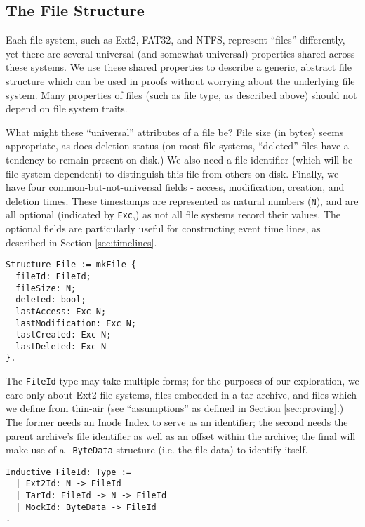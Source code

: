\documentclass[nocopyrightspace]{sigplanconf}
\begin{document}
\subsection{The File Structure}

Each file system, such as Ext2, FAT32, and NTFS, represent ``files''
differently, yet there are several universal (and somewhat-universal)
properties shared across these systems. We use these shared properties to
describe a generic, abstract file structure which can be used in proofs
without worrying about the underlying file system. Many properties of files
(such as file type, as described above) should not depend on file system
traits.

What might these ``universal'' attributes of a file be? File size (in bytes)
seems appropriate, as does deletion status (on most file systems, ``deleted''
files have a tendency to remain present on disk.) We also need a file
identifier (which will be file system dependent) to distinguish this file from
others on disk. Finally, we have four common-but-not-universal fields -
access, modification, creation, and deletion times. These timestamps are
represented as natural numbers ({\tt N}), and are all optional (indicated by
{\tt Exc},) as not all file systems record their values. The optional fields
are particularly useful for constructing event time lines, as described in
Section \ref{sec:timelines}.

\begin{lstlisting}
Structure File := mkFile {
  fileId: FileId;
  fileSize: N;
  deleted: bool;
  lastAccess: Exc N;
  lastModification: Exc N;
  lastCreated: Exc N;
  lastDeleted: Exc N
}.
\end{lstlisting}

The {\tt FileId} type may take multiple forms; for the purposes of our
exploration, we care only about Ext2 file systems, files embedded in a
tar-archive, and files which we define from thin-air (see ``assumptions'' as
defined in Section \ref{sec:proving}.) The former needs an Inode Index to
serve as an identifier; the second needs the parent archive's file identifier
as well as an offset within the archive; the final will make use of a {\tt
ByteData} structure (i.e. the file data) to identify itself.

\begin{lstlisting}
Inductive FileId: Type :=
  | Ext2Id: N -> FileId
  | TarId: FileId -> N -> FileId
  | MockId: ByteData -> FileId
.
\end{lstlisting}
\end{document}

